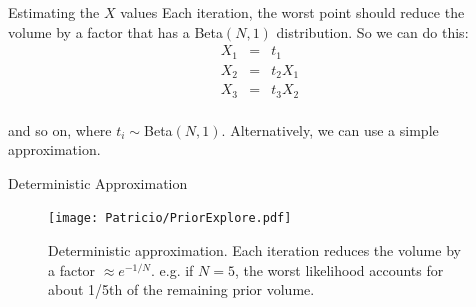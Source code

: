 \begin{frame}[t]{Estimating the $X$ values}
Each iteration, the worst point should reduce the volume by a factor that has
a Beta$(N, 1)$ distribution. So we can do this:
\begin{eqnarray*}
X_1 &=& t_1\\
X_2 &=& t_2X_1\\
X_3 &=& t_3X_2\\
\end{eqnarray*}

and so on, where $t_i \sim $Beta$(N,1)$. Alternatively, we can use a simple
approximation.
\end{frame}

\begin{frame}[t]{Deterministic Approximation}
\begin{figure}[]    		
		\texttt{[image: Patricio/PriorExplore.pdf]}
		\caption{Deterministic approximation. Each iteration reduces
the volume by a factor $\approx e^{-1/N}$. e.g. if $N=5$, the worst likelihood
accounts for about 1/5th of the remaining prior volume.}
\end{figure}
\end{frame}
